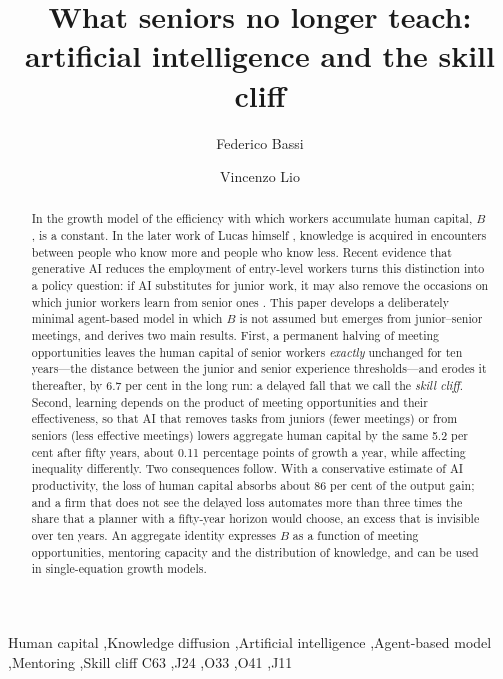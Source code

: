 \documentclass[preprint,12pt,authoryear]{elsarticle}
\newcommand{\todo}[1]{\textcolor{red}{[#1]}}
\begin{document}
\begin{frontmatter}

\title{What seniors no longer teach: artificial intelligence and the skill cliff}

\author[aff1]{Federico Bassi}
\author[aff2]{Vincenzo Lio}
\affiliation[aff1]{organization={\todo{Affiliation}},country={\todo{Country}}}
\affiliation[aff2]{organization={\todo{Affiliation}},country={Italy}}

\begin{abstract}
In the growth model of \citet{Lucas1988} the efficiency with which workers accumulate human capital, $B$, is a constant. In the later work of Lucas himself \citep{Lucas2009,LucasMoll2014}, knowledge is acquired in encounters between people who know more and people who know less. Recent evidence that generative AI reduces the employment of entry-level workers \citep{Brynjolfsson2025,HosseiniLichtinger2025} turns this distinction into a policy question: if AI substitutes for junior work, it may also remove the occasions on which junior workers learn from senior ones \citep{Ide2026}. This paper develops a deliberately minimal agent-based model in which $B$ is not assumed but emerges from junior--senior meetings, and derives two main results. First, a permanent halving of meeting opportunities leaves the human capital of senior workers \emph{exactly} unchanged for ten years---the distance between the junior and senior experience thresholds---and erodes it thereafter, by 6.7 per cent in the long run: a delayed fall that we call the \emph{skill cliff}. Second, learning depends on the product of meeting opportunities and their effectiveness, so that AI that removes tasks from juniors (fewer meetings) or from seniors (less effective meetings) lowers aggregate human capital by the same 5.2 per cent after fifty years, about 0.11 percentage points of growth a year, while affecting inequality differently. Two consequences follow. With a conservative estimate of AI productivity, the loss of human capital absorbs about 86 per cent of the output gain; and a firm that does not see the delayed loss automates more than three times the share that a planner with a fifty-year horizon would choose, an excess that is invisible over ten years. An aggregate identity expresses $B$ as a function of meeting opportunities, mentoring capacity and the distribution of knowledge, and can be used in single-equation growth models.
\end{abstract}

\begin{keyword}
Human capital \sep Knowledge diffusion \sep Artificial intelligence \sep Agent-based model \sep Mentoring \sep Skill cliff
\JEL C63 \sep J24 \sep O33 \sep O41 \sep J11
\end{keyword}

\end{frontmatter}
\end{document}
